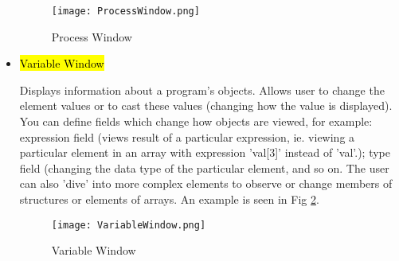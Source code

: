 \documentclass{article}
\begin{document}
\begin{itemize}
	\begin{figure}[p] %
		\begin{center}
			\texttt{[image: ProcessWindow.png]}
		\caption{Process Window}
		\label{fig:proc_window}
		\end{center}
	\end{figure}

	\item \hl{Variable Window}
	
	Displays information about a program's objects. 
	Allows user to change the element values or to cast these values (changing how the value is displayed). 
	You can define fields which change how objects are viewed, for example: expression field (views result of a particular expression, ie. viewing a particular element in an array with expression 'val[3]' instead of 'val'.); type field (changing the data type of the particular element, and so on. 
	The user can also 'dive' into more complex elements to observe or change members of structures or elements of arrays. An example is seen in Fig \ref{fig:variable}.
	
	\begin{figure}[p] %
		\begin{center}
			\texttt{[image: VariableWindow.png]}
		\caption{Variable Window}
		\label{fig:variable}
		\end{center}
	\end{figure}
	
\end{itemize}
\end{document}
